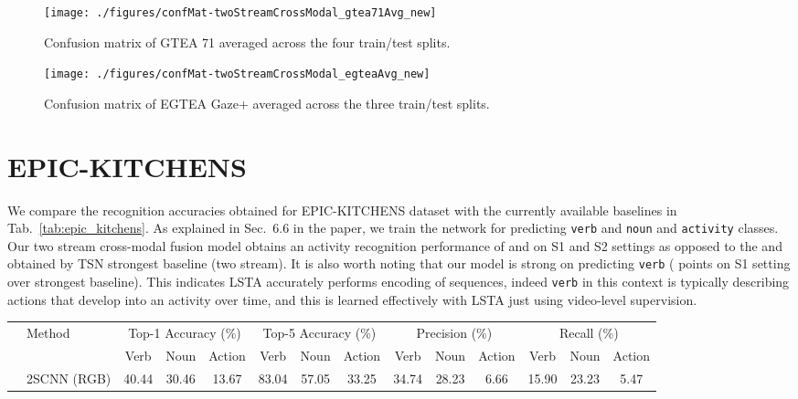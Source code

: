 \documentclass[10pt,twocolumn,letterpaper]{article}
\begin{document}
\begin{matrix*}[r]
	\begin{figure*}[t]
		\centering
		\texttt{[image: ./figures/confMat-twoStreamCrossModal\_gtea71Avg\_new]}
		\caption{Confusion matrix of GTEA 71 averaged across the four train/test splits.}
		\label{fig:twoStream_crossmodal_gtea71_conf}
	\end{figure*}
	
	\begin{figure*}[t]
		\centering
		\texttt{[image: ./figures/confMat-twoStreamCrossModal\_egteaAvg\_new]}
		\caption{Confusion matrix of EGTEA Gaze+ averaged across the three train/test splits.}
		\label{fig:twoStream_crossmodal_egtea_conf}
	\end{figure*}
	
	
	\section{EPIC-KITCHENS}
	We compare the recognition accuracies obtained for EPIC-KITCHENS dataset with the currently available baselines \cite{Damen_2018_ECCV} in Tab.~\ref{tab:epic_kitchens}. As explained in Sec.~6.6 in the paper, we train the network for predicting \verb+verb+ and \verb+noun+ and \verb+activity+ classes. Our two stream cross-modal fusion model obtains an activity recognition performance of  and  on S1 and S2 settings as opposed to the  and  obtained by TSN strongest baseline (two stream). It is also worth noting that our model is strong on predicting \verb+verb+ ( points on S1 setting over strongest baseline). This indicates LSTA accurately performs encoding of sequences, indeed \verb+verb+ in this context is typically describing actions that develop into an activity over time, and this is learned effectively with LSTA just using video-level supervision.
\begin{table*}[t]\small
	\centering
	\begin{tabular}{c|l|c|c|c|c|c|c|c|c|c|c|c|c}
		\hline
		& Method & \multicolumn{3}{c|}{Top-1 Accuracy (\%)} & \multicolumn{3}{c|}{Top-5 Accuracy (\%)} & \multicolumn{3}{c|}{Precision (\%)} & \multicolumn{3}{c}{Recall (\%)} \\
		\cline{3-14}
		& & \parbox{0.7cm}{Verb} & \parbox{0.7cm}{Noun} & \parbox{0.8cm}{Action} & \parbox{0.7cm}{Verb} & \parbox{0.7cm}{Noun} & \parbox{0.8cm}{Action} & \parbox{0.7cm}{Verb} & \parbox{0.7cm}{Noun} & \parbox{0.8cm}{Action} & \parbox{0.7cm}{Verb} & \parbox{0.7cm}{Noun} & \parbox{0.8cm}{Action}\\
		\hline \hline
		 & 2SCNN (RGB) & 40.44 & 30.46 & 13.67 & 83.04 & 57.05 & 33.25 & 34.74 & 28.23 & 6.66 & 15.90 & 23.23 & 5.47\\ 

\end{tabular}
\end{table*}
\end{matrix*}
\end{document}
